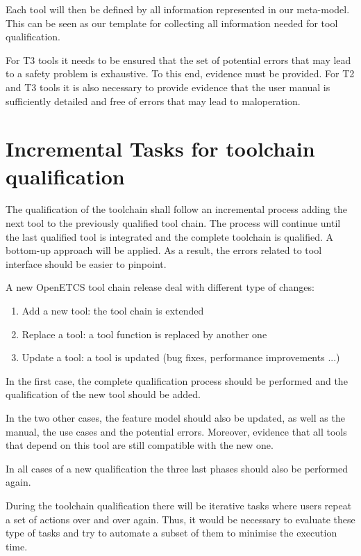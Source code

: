 Each tool will then be defined by all information represented in our
meta-model. This can be seen as our template for collecting all
information needed for tool qualification.

For T3 tools it needs to be ensured that the set of potential errors that may lead to a safety problem is exhaustive. To this end, evidence must be provided. For T2 and T3 tools it is also necessary to provide evidence that the user manual is sufficiently detailed and free of errors that may lead to maloperation. 





\section{Incremental Tasks for toolchain qualification}
\label{sec:incremental}

The qualification of the toolchain shall follow an incremental process
adding the next tool to the previously qualified tool chain. The
process will continue until the last qualified tool is integrated and
the complete toolchain is qualified. A bottom-up approach will be
applied. As a result, the errors related to tool interface should be
easier to pinpoint.

A new  OpenETCS tool chain release deal with different type of changes:
\begin{enumerate} 
\item Add a new tool: the tool chain is extended
\item Replace a tool: a tool function is replaced by another one
\item Update a tool: a tool is updated (bug fixes, performance
  improvements ...)
\end{enumerate}

In the first case, the complete qualification process should be
performed and the qualification of the new tool should be added.

In the two other cases, the feature model should also be updated, as
well as the manual, the use cases and the potential  errors.
Moreover, evidence that all tools that depend on this tool are still
compatible with the new one.  

In all cases of a new qualification  the three last phases should also be
performed again.

During the toolchain qualification there will be iterative tasks where
users repeat a set of actions over and over again. Thus, it would be
necessary to evaluate these type of tasks and try to automate a subset
of them to minimise the execution time.



